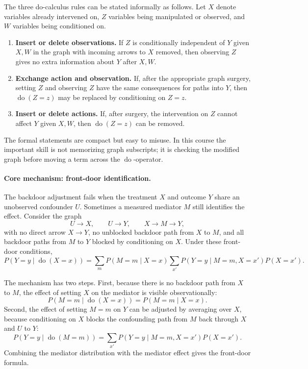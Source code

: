 The three do-calculus rules can be stated informally as follows. Let \(X\) denote variables already intervened on, \(Z\) variables being manipulated or observed, and \(W\) variables being conditioned on.
\begin{enumerate}[label=\textbf{Rule \arabic*.}, leftmargin=*]
\item \textbf{Insert or delete observations.} If \(Z\) is conditionally independent of \(Y\) given \(X,W\) in the graph with incoming arrows to \(X\) removed, then observing \(Z\) gives no extra information about \(Y\) after \(X,W\).
\item \textbf{Exchange action and observation.} If, after the appropriate graph surgery, setting \(Z\) and observing \(Z\) have the same consequences for paths into \(Y\), then \(\operatorname{do}(Z=z)\) may be replaced by conditioning on \(Z=z\).
\item \textbf{Insert or delete actions.} If, after surgery, the intervention on \(Z\) cannot affect \(Y\) given \(X,W\), then \(\operatorname{do}(Z=z)\) can be removed.
\end{enumerate}
The formal statements are compact but easy to misuse. In this course the important skill is not memorizing graph subscripts; it is checking the modified graph before moving a term across the \(\operatorname{do}\)-operator.

\paragraph{Core mechanism: front-door identification.}
The backdoor adjustment fails when the treatment \(X\) and outcome \(Y\) share an unobserved confounder \(U\). Sometimes a measured mediator \(M\) still identifies the effect. Consider the graph
\[
U\to X,\qquad U\to Y,\qquad X\to M\to Y,
\]
with no direct arrow \(X\to Y\), no unblocked backdoor path from \(X\) to \(M\), and all backdoor paths from \(M\) to \(Y\) blocked by conditioning on \(X\). Under these front-door conditions,
\[
\boxed{
P(Y=y\mid \operatorname{do}(X=x))
=
\sum_m P(M=m\mid X=x)
\sum_{x'} P(Y=y\mid M=m,X=x')P(X=x').
}
\]

The mechanism has two steps. First, because there is no backdoor path from \(X\) to \(M\), the effect of setting \(X\) on the mediator is visible observationally:
\[
P(M=m\mid \operatorname{do}(X=x))=P(M=m\mid X=x).
\]
Second, the effect of setting \(M=m\) on \(Y\) can be adjusted by averaging over \(X\), because conditioning on \(X\) blocks the confounding path from \(M\) back through \(X\) and \(U\) to \(Y\):
\[
P(Y=y\mid \operatorname{do}(M=m))
=\sum_{x'}P(Y=y\mid M=m,X=x')P(X=x').
\]
Combining the mediator distribution with the mediator effect gives the front-door formula.

